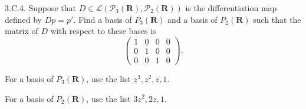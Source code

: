 \documentclass[a5paper]{article}
\begin{document}
\newcommand   \C           {\mathbf{C}}
\newcommand   \R           {\mathbf{R}}
\renewcommand \L           {\mathcal{L}}
\newcommand   \F           {\mathbf{F}}
\renewcommand \P           {\mathcal{P}}
\newcommand   \M           {\mathcal{M}}
\newcommand   \op          {\operatorname}

    3.C.4.
    Suppose that $D \in \L\left(\P_3(\R), \P_2(\R)\right)$ is the differentiation map defined by $Dp = p'$.
    Find a basis of $P_3(\R)$ and a basis of $P_2(\R)$ such that the matrix of $D$ with respect to these bases is
\begin{equation*}
    \begin{pmatrix}
        1 & 0 & 0 & 0  \\
        0 & 1 & 0 & 0  \\
        0 & 0 & 1 & 0
    \end{pmatrix} .
\end{equation*}

    For a basis of $P_3(\R)$, use the list $z^3, z^2, z, 1$.

    For a basis of $P_2(\R)$, use the list $3z^2, 2z, 1$.
\end{document}
